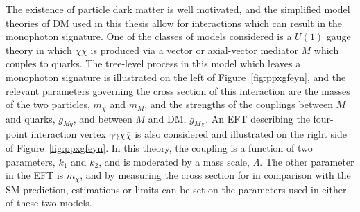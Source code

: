  The existence of particle dark matter
  is well motivated, and the simplified
  model theories of DM used in this thesis allow
  for interactions which can result in
  the monophoton signature.
 One of the classes of models considered is a $U(1)$
  gauge theory in which $\chi\overline{\chi}$
  is produced via a vector or axial-vector mediator $M$
  which couples to quarks. 
 The tree-level process in this model which leaves
  a  monophoton signature 
  is illustrated on the left of
  Figure~\ref{fig:ppxgfeyn}, and the
  relevant parameters governing
  the cross section of this interaction are
  the masses of the two particles, $m_\chi$
  and $m_M$, and the strengths of the couplings
  between $M$ and quarks, $g_{Mq}$,
  and between $M$ and DM, $g_{M\chi}$.
 An EFT describing the four-point interaction
  vertex $\gamma\gamma\chi\overline{\chi}$ is also
  considered and illustrated on the right side of
  Figure~\ref{fig:ppxgfeyn}.
 In this theory, the coupling is a function
  of two parameters, $k_1$ and $k_2$,
  and is moderated by a mass scale, $\Lambda$.
 The other parameter in the EFT is $m_\chi$,
  and by measuring the cross section for
  \pploneg in comparison with the SM prediction,
  estimations or limits can be set on 
  the parameters used in either of these
  two models.
  
